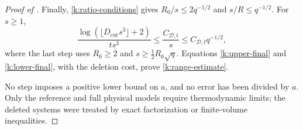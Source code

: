 \begin{proof}[Proof of ]
Finally, \eqref{k:ratio-conditions} gives
$R_0/s\le2q^{-1/2}$ and $s/R\le q^{-1/2}$.  For $s\ge1$,
\[
 \frac{\log(\lfloor D_{\mathrm{cut}}s^3\rfloor+2)}{ts^3}
 \le\frac{C_{\mathcal D,t}}s
 \le C_{\mathcal D,t}q^{-1/2},
\]
where the last step uses $R_0\ge2$ and
$s\ge\tfrac12R_0\sqrt q$.  Equations
\eqref{k:upper-final} and \eqref{k:lower-final}, with the deletion cost,
prove \eqref{k:range-estimate}.

No step imposes a positive lower bound on $a$, and no error has been
divided by $a$.  Only the reference and full physical models require
thermodynamic limits; the deleted systems were treated by exact
factorization or finite-volume inequalities.
\end{proof}
